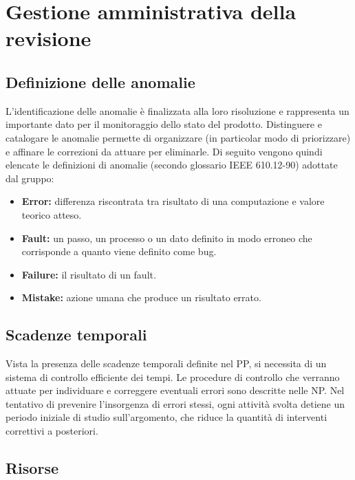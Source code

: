 \documentclass[openany,12pt,a4paper]{report}
\begin{document}

\chapter{Gestione amministrativa della revisione}

\section{Definizione delle anomalie}

L’identificazione delle anomalie è finalizzata alla loro risoluzione e rappresenta un importante dato per il monitoraggio dello stato del prodotto. Distinguere e catalogare le anomalie permette di organizzare (in particolar modo di priorizzare) e affinare le correzioni da attuare per eliminarle. Di seguito
vengono quindi elencate le definizioni di anomalie (secondo glossario IEEE 610.12-90) adottate dal gruppo:

\begin{itemize}
    \item \textbf{Error:} differenza riscontrata tra risultato di una computazione e valore teorico atteso.
    \item \textbf{Fault:} un passo, un processo o un dato definito in modo erroneo che corrisponde a quanto viene definito come bug.
    \item \textbf{Failure:} il risultato di un fault.
    \item \textbf{Mistake:} azione umana che produce un risultato errato.
\end{itemize}

\section{Scadenze temporali}

Vista la presenza delle scadenze temporali definite nel PP, si necessita di un sistema di controllo efficiente dei tempi. Le procedure di controllo che verranno attuate per individuare e correggere eventuali errori sono descritte
nelle NP. Nel tentativo di prevenire l'insorgenza di errori stessi, ogni attività svolta detiene un periodo iniziale di
studio sull'argomento, che riduce la quantità di interventi correttivi a posteriori.

\section{Risorse}
\end{document}
